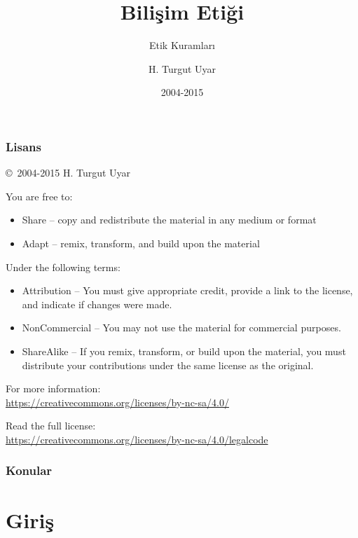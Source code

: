 \documentclass[dvipsnames]{beamer}
\title{Bilişim Etiği}
\subtitle{Etik Kuramları}
\author{H. Turgut Uyar}
\date{2004-2015}
\theoremstyle{plain}
\begin{document}
\begin{frame}
  \titlepage
\end{frame}

\begin{frame}
  \frametitle{Lisans}

  \hfill
  \copyright~2004-2015 H. Turgut Uyar

  \vfill
  \begin{footnotesize}
    You are free to:
    \begin{itemize}
      \itemsep0em
      \item Share -- copy and redistribute the material in any medium or format
      \item Adapt -- remix, transform, and build upon the material
    \end{itemize}

    Under the following terms:
    \begin{itemize}
      \itemsep0em
      \item Attribution -- You must give appropriate credit, provide a link to
        the license, and indicate if changes were made.

      \item NonCommercial -- You may not use the material for commercial
        purposes.

      \item ShareAlike -- If you remix, transform, or build upon the material,
        you must distribute your contributions under the same license as the
        original.
    \end{itemize}
  \end{footnotesize}

  \begin{small}
    For more information:\\
    \url{https://creativecommons.org/licenses/by-nc-sa/4.0/}

    \smallskip
    Read the full license:\\
    \url{https://creativecommons.org/licenses/by-nc-sa/4.0/legalcode}
  \end{small}
\end{frame}

\begin{frame}
  \frametitle{Konular}
  \tableofcontents
\end{frame}

\section{Giriş}
\end{document}
